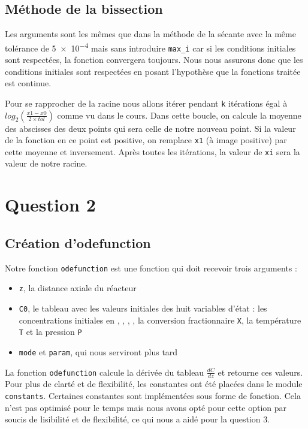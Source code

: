 \documentclass[11pt]{report}
\newcommand{\mychapter}[2]{
    \setcounter{chapter}{#1}
    \setcounter{section}{0}
    \chapter*{#2}
    \addcontentsline{toc}{chapter}{#2}
}
\begin{document}
        \section{Méthode de la bissection}
            Les arguments sont les mêmes que dans la méthode de la sécante avec la même tolérance de \num{5e-4} mais sans introduire \verb|max_i|
            car si les conditions initiales sont respectées, la fonction convergera toujours.
            Nous nous assurons donc que les conditions initiales sont respectées en posant l'hypothèse que la fonctions traitée est continue.
            \par
            Pour se rapprocher de la racine nous allons itérer pendant \verb|k| itérations égal à
            $log_2(\frac{x1-x0}{2\times tol})$ comme vu dans le cours.
            Dans cette boucle, on calcule la moyenne des abscisses des deux points qui sera celle de notre nouveau point.
            Si la valeur de la fonction en ce point est positive, on remplace \verb|x1| (à image positive) par cette moyenne et inversement.
            Après toutes les itérations, la valeur de \verb|xi| sera la valeur de notre racine.

    \mychapter{2}{Question 2}
        \section{Création d'odefunction}
            Notre fonction \verb|odefunction| est une fonction qui doit recevoir trois arguments :
            \begin{itemize}
                \item \verb|z|, la distance axiale  du réacteur
                \item \verb|C0|, le tableau avec les valeurs initiales des huit variables d'état :
                    les concentrations initiales en , , , , 
                    la conversion fractionnaire \verb|X|,
                    la température \verb|T|
                    et la pression \verb|P|
                \item \verb|mode| et \verb|param|, qui nous serviront plus tard
            \end{itemize}
            La fonction \verb|odefunction| calcule la dérivée du tableau $\frac{dC}{dz}$ et retourne ces valeurs.
            Pour plus de clarté et de flexibilité, les constantes ont été placées dans le module \verb|constants|.
            Certaines constantes sont implémentées sous forme de fonction.
            Cela n'est pas optimisé pour le temps mais nous avons opté pour cette option par soucis de lisibilité
            et de flexibilité, ce qui nous a aidé pour la question 3.
\end{document}
